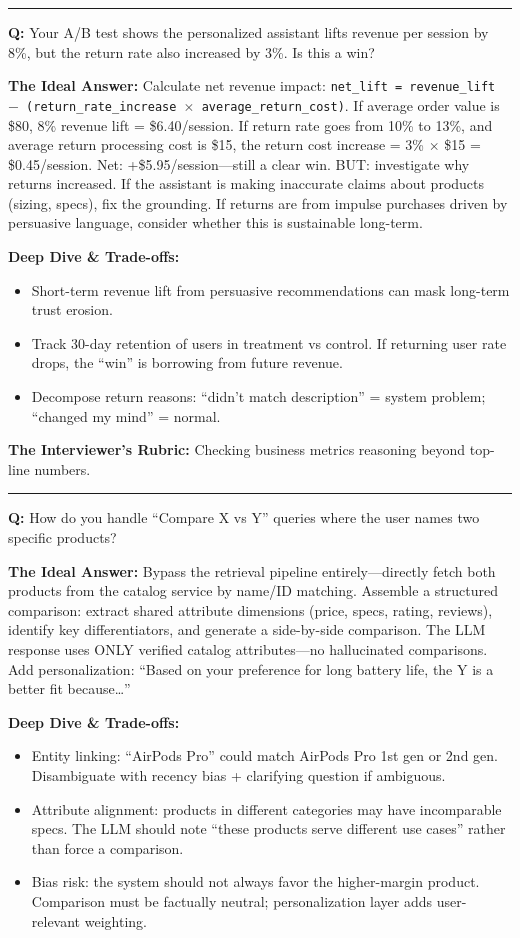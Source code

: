 \bigskip\hrule\bigskip

\textbf{Q:} Your A/B test shows the personalized assistant lifts revenue per session by 8\%, but the return rate also increased by 3\%. Is this a win?

\textbf{The Ideal Answer:} Calculate net revenue impact: \texttt{net\_lift = revenue\_lift $-$ (return\_rate\_increase $\times$ average\_return\_cost)}. If average order value is \$80, 8\% revenue lift = \$6.40/session. If return rate goes from 10\% to 13\%, and average return processing cost is \$15, the return cost increase = 3\% $\times$ \$15 = \$0.45/session. Net: +\$5.95/session---still a clear win. BUT: investigate why returns increased. If the assistant is making inaccurate claims about products (sizing, specs), fix the grounding. If returns are from impulse purchases driven by persuasive language, consider whether this is sustainable long-term.

\textbf{Deep Dive \& Trade-offs:}
\begin{itemize}
  \item Short-term revenue lift from persuasive recommendations can mask long-term trust erosion.
  \item Track 30-day retention of users in treatment vs control. If returning user rate drops, the ``win'' is borrowing from future revenue.
  \item Decompose return reasons: ``didn't match description'' = system problem; ``changed my mind'' = normal.
\end{itemize}

\textbf{The Interviewer's Rubric:} Checking business metrics reasoning beyond top-line numbers.

\bigskip\hrule\bigskip

\textbf{Q:} How do you handle ``Compare X vs Y'' queries where the user names two specific products?

\textbf{The Ideal Answer:} Bypass the retrieval pipeline entirely---directly fetch both products from the catalog service by name/ID matching. Assemble a structured comparison: extract shared attribute dimensions (price, specs, rating, reviews), identify key differentiators, and generate a side-by-side comparison. The LLM response uses ONLY verified catalog attributes---no hallucinated comparisons. Add personalization: ``Based on your preference for long battery life, the Y is a better fit because\ldots''

\textbf{Deep Dive \& Trade-offs:}
\begin{itemize}
  \item Entity linking: ``AirPods Pro'' could match AirPods Pro 1st gen or 2nd gen. Disambiguate with recency bias + clarifying question if ambiguous.
  \item Attribute alignment: products in different categories may have incomparable specs. The LLM should note ``these products serve different use cases'' rather than force a comparison.
  \item Bias risk: the system should not always favor the higher-margin product. Comparison must be factually neutral; personalization layer adds user-relevant weighting.
\end{itemize}

